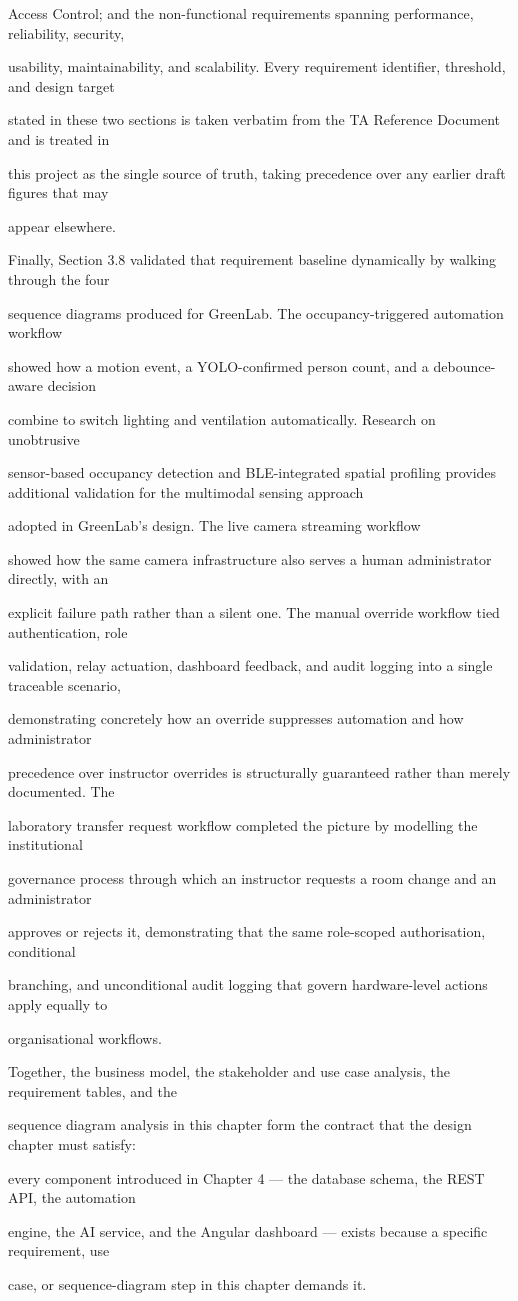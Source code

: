 Access Control; and the non-functional requirements spanning performance, reliability, security,

usability, maintainability, and scalability. Every requirement identifier, threshold, and design target

stated in these two sections is taken verbatim from the TA Reference Document and is treated in

this project as the single source of truth, taking precedence over any earlier draft figures that may

appear elsewhere.

Finally, Section 3.8 validated that requirement baseline dynamically by walking through the four

sequence diagrams produced for GreenLab. The occupancy-triggered automation workflow

showed how a motion event, a YOLO-confirmed person count, and a debounce-aware decision

combine to switch lighting and ventilation automatically. Research on unobtrusive

sensor-based occupancy detection \cite{chen2018} and BLE-integrated spatial proﬁling
\cite{green2024} provides additional validation for the multimodal sensing approach

adopted in GreenLab's design. The live camera streaming workflow

showed how the same camera infrastructure also serves a human administrator directly, with an

explicit failure path rather than a silent one. The manual override workflow tied authentication, role

validation, relay actuation, dashboard feedback, and audit logging into a single traceable scenario,

demonstrating concretely how an override suppresses automation and how administrator

precedence over instructor overrides is structurally guaranteed rather than merely documented. The

laboratory transfer request workflow completed the picture by modelling the institutional

governance process through which an instructor requests a room change and an administrator

approves or rejects it, demonstrating that the same role-scoped authorisation, conditional

branching, and unconditional audit logging that govern hardware-level actions apply equally to

organisational workflows.

Together, the business model, the stakeholder and use case analysis, the requirement tables, and the

sequence diagram analysis in this chapter form the contract that the design chapter must satisfy:

every component introduced in Chapter 4 --- the database schema, the REST API, the automation

engine, the AI service, and the Angular dashboard --- exists because a specific requirement, use

case, or sequence-diagram step in this chapter demands it.


